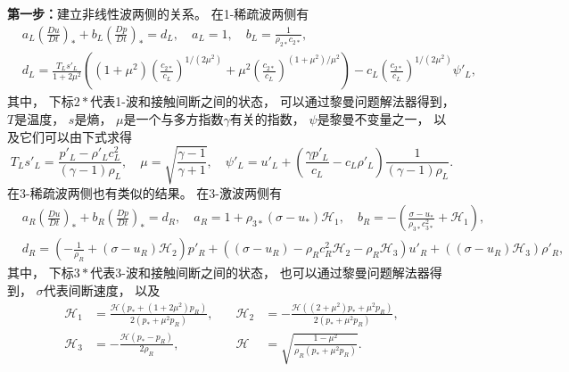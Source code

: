 \vspace{0.3\baselineskip} %
{\noindent\bf 第一步：}建立非线性波两侧的关系。
在1-稀疏波两侧有
\begin{equation}
  \label{eq:1D-GRP-rare-guanxi}
  \begin{aligned}
     & a_L \left(\frac{Du}{Dt}\right)_* + b_L \left(\frac{Dp}{Dt}\right)_* = d_L, \quad a_L = 1, \quad b_L = \frac{1}{\rho_{2*}c_{2*}}, \\
     & d_L =
    \frac{T_Ls'_L}{1+2\mu^2} \left((1+\mu^2)\left(\frac{c_{2*}}{c_L}\right)^{1/(2\mu^2)}+\mu^2\left(\frac{c_{2*}}{c_L}\right)^{(1+\mu^2)/\mu^2}\right)-c_L\left(\frac{c_{2*}}{c_L}\right)^{1/(2\mu^2)}\psi'_L,
  \end{aligned}
\end{equation}
其中，
下标$2*$代表1-波和接触间断之间的状态，
可以通过黎曼问题解法器得到，
$T$是温度，
$s$是熵，
$\mu$是一个与多方指数$\gamma$有关的指数，
$\psi$是黎曼不变量之一，
以及它们可以由下式求得
\begin{equation}
  T_Ls'_L = \frac{p'_L-\rho'_Lc_L^2}{(\gamma-1)\rho_L}, \quad
  \mu = \sqrt{\frac{\gamma-1}{\gamma+1}}, \quad
  \psi'_L=u'_L+\left(\frac{\gamma p'_L}{c_L}-c_L\rho'_L\right) \frac{1}{(\gamma-1)\rho_L}.
\end{equation}
在3-稀疏波两侧也有类似的结果。
在3-激波两侧有
\begin{equation}
  \begin{aligned}
     & a_R \left(\frac{Du}{Dt}\right)_* + b_R \left(\frac{Dp}{Dt}\right)_* = d_R, \quad a_R = 1 + \rho_{3*}(\sigma-u_*) \mathcal{H}_1, \quad b_R = -\left(\frac{\sigma-u_*}{\rho_{3*}c_{3*}^2} + \mathcal{H}_1\right), \\
     & d_R = \left(-\frac{1}{\rho_R} + (\sigma-u_R) \mathcal{H}_2\right) p'_R + \left((\sigma-u_R) - \rho_R c_R^2 \mathcal{H}_2 - \rho_R \mathcal{H}_3\right) u'_R + \left((\sigma-u_R)\mathcal{H}_3\right) \rho'_R,
  \end{aligned}
\end{equation}
其中，
下标$3*$代表3-波和接触间断之间的状态，
也可以通过黎曼问题解法器得到，
$\sigma$代表间断速度，
以及
\begin{equation}
  \begin{aligned}
    \mathcal{H}_1 & = \frac{\mathcal{H}\left(p_*+(1+2\mu^2)p_R\right)}{2(p_*+\mu^2 p_R)},      & \quad
    \mathcal{H}_2 & = -\frac{\mathcal{H}\left((2+\mu^2)p_*+\mu^2p_R\right)}{2(p_*+\mu^2 p_R)},          \\
    \mathcal{H}_3 & = -\frac{\mathcal{H}\left(p_*-p_R\right)}{2\rho_R},                        & \quad
    \mathcal{H}   & = \sqrt{\frac{1-\mu^2}{\rho_R(p_*+\mu^2p_R)}}.
  \end{aligned}
\end{equation}
